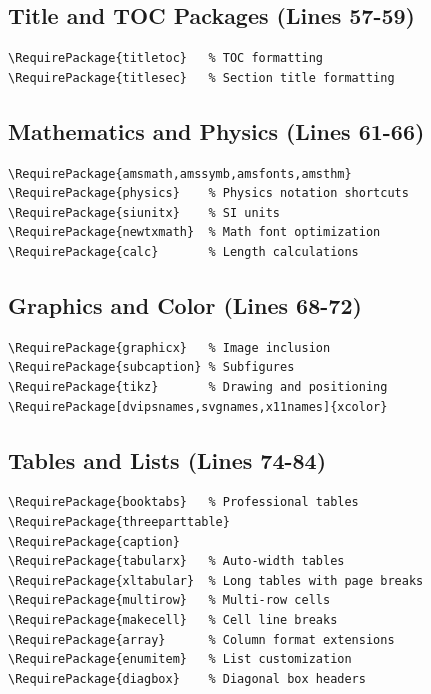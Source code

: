 \documentclass[linux]{hustreport}
\begin{document}
\subsection{Title and TOC Packages (Lines 57-59)}

\begin{verbatim}
\RequirePackage{titletoc}   % TOC formatting
\RequirePackage{titlesec}   % Section title formatting
\end{verbatim}

\subsection{Mathematics and Physics (Lines 61-66)}

\begin{verbatim}
\RequirePackage{amsmath,amssymb,amsfonts,amsthm}
\RequirePackage{physics}    % Physics notation shortcuts
\RequirePackage{siunitx}    % SI units
\RequirePackage{newtxmath}  % Math font optimization
\RequirePackage{calc}       % Length calculations
\end{verbatim}

\subsection{Graphics and Color (Lines 68-72)}

\begin{verbatim}
\RequirePackage{graphicx}   % Image inclusion
\RequirePackage{subcaption} % Subfigures
\RequirePackage{tikz}       % Drawing and positioning
\RequirePackage[dvipsnames,svgnames,x11names]{xcolor}
\end{verbatim}

\subsection{Tables and Lists (Lines 74-84)}

\begin{verbatim}
\RequirePackage{booktabs}   % Professional tables
\RequirePackage{threeparttable}
\RequirePackage{caption}
\RequirePackage{tabularx}   % Auto-width tables
\RequirePackage{xltabular}  % Long tables with page breaks
\RequirePackage{multirow}   % Multi-row cells
\RequirePackage{makecell}   % Cell line breaks
\RequirePackage{array}      % Column format extensions
\RequirePackage{enumitem}   % List customization
\RequirePackage{diagbox}    % Diagonal box headers
\end{verbatim}
\end{document}
